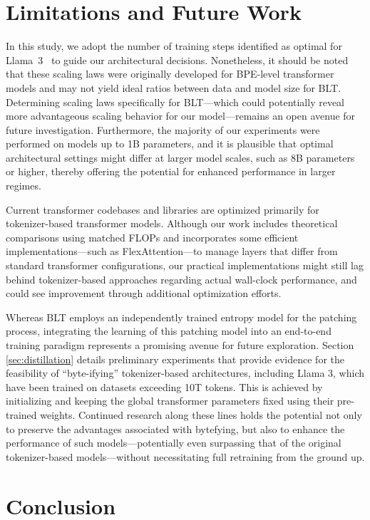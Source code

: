 \section{Limitations and Future Work}

In this study, we adopt the number of training steps identified as optimal for Llama~3~\citep{dubey2024llama} to guide our architectural decisions. Nonetheless, it should be noted that these scaling laws were originally developed for BPE-level transformer models and may not yield ideal ratios between data and model size for {\textsc BLT}. Determining scaling laws specifically for {\textsc BLT}—which could potentially reveal more advantageous scaling behavior for our model—remains an open avenue for future investigation. Furthermore, the majority of our experiments were performed on models up to 1B parameters, and it is plausible that optimal architectural settings might differ at larger model scales, such as 8B parameters or higher, thereby offering the potential for enhanced performance in larger regimes.

Current transformer codebases and libraries are optimized primarily for tokenizer-based transformer models. Although our work includes theoretical comparisons using matched FLOPs and incorporates some efficient implementations—such as FlexAttention—to manage layers that differ from standard transformer configurations, our practical implementations might still lag behind tokenizer-based approaches regarding actual wall-clock performance, and could see improvement through additional optimization efforts.

Whereas {\textsc BLT} employs an independently trained entropy model for the patching process, integrating the learning of this patching model into an end-to-end training paradigm represents a promising avenue for future exploration. Section \ref{sec:distillation} details preliminary experiments that provide evidence for the feasibility of “byte-ifying” tokenizer-based architectures, including Llama 3, which have been trained on datasets exceeding 10T tokens. This is achieved by initializing and keeping the global transformer parameters fixed using their pre-trained weights. Continued research along these lines holds the potential not only to preserve the advantages associated with bytefying, but also to enhance the performance of such models—potentially even surpassing that of the original tokenizer-based models—without necessitating full retraining from the ground up.

\section{Conclusion}
\label{section:conclusion}

